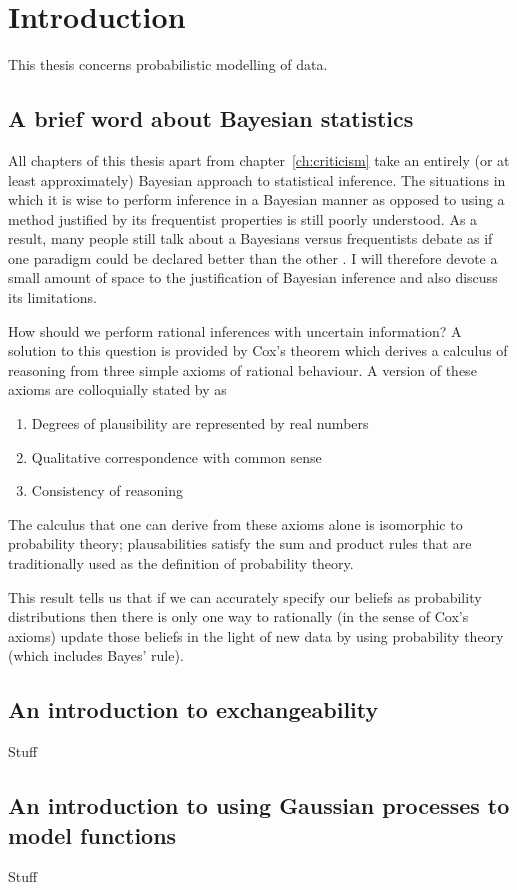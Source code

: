 
\inbpdocument

\chapter{Introduction}
\label{ch:intro}

This thesis concerns probabilistic modelling of data.

\section{A brief word about Bayesian statistics}

All chapters of this thesis apart from chapter~\ref{ch:criticism} take an entirely (or at least approximately) Bayesian approach to statistical inference.
The situations in which it is wise to perform inference in a Bayesian manner as opposed to using a method justified by its frequentist properties is still poorly understood.
As a result, many people still talk about a Bayesians versus frequentists debate as if one paradigm could be declared better than the other .
I will therefore devote a small amount of space to the justification of Bayesian inference and also discuss its limitations.

How should we perform rational inferences with uncertain information?
A solution to this question is provided by Cox's theorem which derives a calculus of reasoning from three simple axioms of rational behaviour.
A version of these axioms are colloquially stated by \citet{Edwin2003-jh} as
\begin{enumerate}
  \item Degrees of plausibility are represented by real numbers
  \item Qualitative correspondence with common sense
  \item Consistency of reasoning
\end{enumerate}
The calculus that one can derive from these axioms alone is isomorphic to probability theory; plausabilities satisfy the sum and product rules that are traditionally used as the definition of probability theory.

This result tells us that if we can accurately specify our beliefs as probability distributions then there is only one way to rationally (in the sense of Cox's axioms) update those beliefs in the light of new data \ie by using probability theory (which includes Bayes' rule).

\section{An introduction to exchangeability}

Stuff

\section{An introduction to using Gaussian processes to model functions}

Stuff

\outbpdocument{


}


